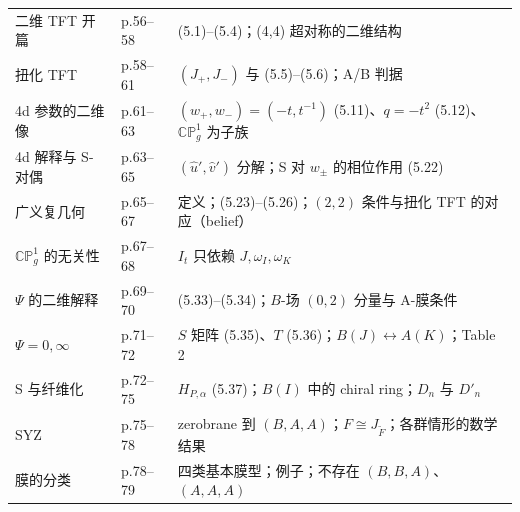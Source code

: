\begin{longtable}{@{}llp{9.4cm}@{}}
二维 TFT 开篇 & p.56--58 & (5.1)--(5.4)；(4,4) 超对称的二维结构 \\
扭化 TFT & p.58--61 & $(J_+,J_-)$ 与 (5.5)--(5.6)；A/B 判据 \\
4d 参数的二维像 & p.61--63 & $(w_+,w_-)=(-t,t^{-1})$ (5.11)、$q=-t^2$ (5.12)、$\mathbb{CP}^1_g$ 为子族 \\
4d 解释与 S-对偶 & p.63--65 & $(\hat u',\hat v')$ 分解；S 对 $w_\pm$ 的相位作用 (5.22) \\
广义复几何 & p.65--67 & 定义；(5.23)--(5.26)；$(2,2)$ 条件与扭化 TFT 的对应（belief）\\
$\mathbb{CP}^1_g$ 的无关性 & p.67--68 & $I_t$ 只依赖 $J,\omega_I,\omega_K$ \\
$\Psi$ 的二维解释 & p.69--70 & (5.33)--(5.34)；$B$-场 $(0,2)$ 分量与 A-膜条件 \\
$\Psi=0,\infty$ & p.71--72 & $S$ 矩阵 (5.35)、$T$ (5.36)；$B(J)\leftrightarrow A(K)$；Table 2 \\
S 与纤维化 & p.72--75 & $H_{P,\alpha}$ (5.37)；$B(I)$ 中的 chiral ring；$D_n$ 与 $D'_n$ \\
SYZ & p.75--78 & zerobrane 到 $(B,A,A)$；$F\cong J_{\tilde F}$；各群情形的数学结果 \\
膜的分类 & p.78--79 & 四类基本膜型；例子；不存在 $(B,B,A)$、$(A,A,A)$ \\
\end{longtable}


